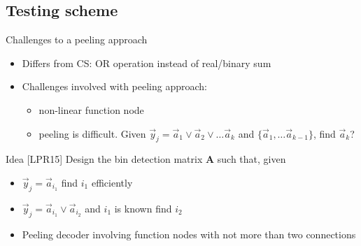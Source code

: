 \subsection{Testing scheme}
\begin{frame}{Challenges to a peeling approach}
\begin{itemize}
\item Differs from CS: OR operation instead of real/binary sum
\item Challenges involved with peeling approach:
\begin{itemize}
\item non-linear function node
\item peeling is difficult. Given $\vec{y}_j=\vec{a}_{1}\vee \vec{a}_{2}\vee \ldots \vec{a}_{k}$ and $\{\vec{a}_1,\ldots \vec{a}_{k-1}\}$, find $\vec{a}_k$? 
\end{itemize}
\end{itemize}
\vspace{3ex}

\pause

\begin{block}{Idea [LPR15]}
Design the bin detection matrix $\mathbf{A}$ such that, given
\begin{itemize}
\item  $\vec{y}_j=\vec{a}_{i_1}$ find $i_1$ efficiently
\item $\vec{y}_j=\vec{a}_{i_1}\vee \vec{a}_{i_2}$ and $i_1$ is known find $i_2$
\item<3-> Peeling decoder involving function nodes with not more than two connections
\end{itemize}

\end{block}
\end{frame}

